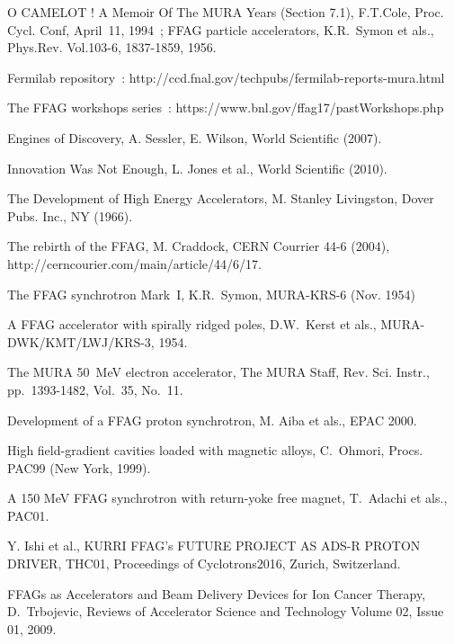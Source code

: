 \documentclass[12pt]{article}
\begin{document}
\vspace{-2ex}
\begin{thebibliography}{99}
\vspace{-1ex}

\fontsize{15}{18} \selectfont

 O CAMELOT ! A Memoir Of The MURA Years (Section 7.1), F.T.Cole, Proc. Cycl. Conf, April~11, 1994~; 
FFAG particle accelerators, K.R.~Symon et als., Phys.Rev. Vol.103-6, 1837-1859, 1956. 

 Fermilab repository~: http://ccd.fnal.gov/techpubs/fermilab-reports-mura.html

 The FFAG workshops series~: https://www.bnl.gov/ffag17/pastWorkshops.php

 Engines of Discovery, A. Sessler, E. Wilson, World Scientific (2007).

 Innovation Was Not Enough, L. Jones et al., World Scientific (2010).

 The Development of High Energy Accelerators, M. Stanley Livingston, Dover Pubs. Inc., NY (1966).

 The rebirth of the FFAG, M. Craddock, CERN Courrier 44-6 (2004), http://cerncourier.com/main/article/44/6/17. 

 The FFAG synchrotron Mark~I, K.R.~Symon, MURA-KRS-6 (Nov. 1954)

 A FFAG accelerator with spirally ridged poles, D.W.~Kerst et als., MURA-DWK/KMT/LWJ/KRS-3, 1954. 

 The MURA 50~MeV electron accelerator, The MURA Staff, Rev. Sci. Instr., pp.~1393-1482, Vol.~35, No.~11. 

 Development of a FFAG proton synchrotron,  M. Aiba et als., EPAC 2000. 

 High field-gradient cavities loaded with magnetic alloys, C.~Ohmori, Procs. PAC99  (New York, 1999). 

 A 150 MeV FFAG synchrotron with  return-yoke free  magnet, T.~Adachi et als., PAC01. 

Y. Ishi et al.,
KURRI FFAG's FUTURE PROJECT AS ADS-R PROTON DRIVER, THC01, Proceedings of Cyclotrons2016, Zurich, Switzerland.

  FFAGs as Accelerators and Beam Delivery Devices for Ion Cancer Therapy, 
D.~Trbojevic, 
Reviews of Accelerator Science and Technology
Volume 02, Issue 01, 2009. 


\end{thebibliography}
\end{document}
